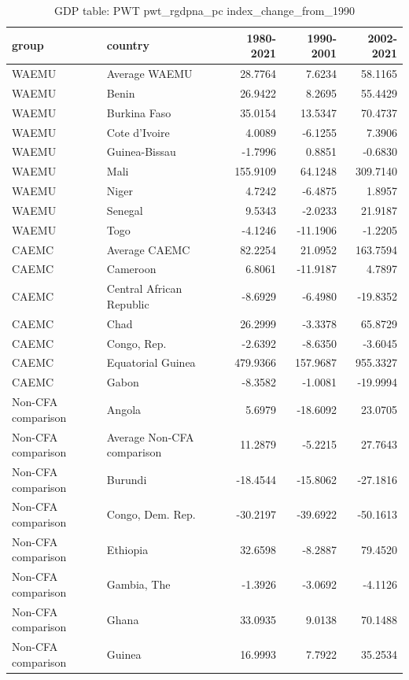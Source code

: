 \begin{table}

\caption{GDP table: PWT pwt_rgdpna_pc index_change_from_1990}
\centering
\begin{tabular}[t]{llrrr}
\toprule
group & country & 1980-2021 & 1990-2001 & 2002-2021\\
\midrule
WAEMU & Average WAEMU & 28.7764 & 7.6234 & 58.1165\\
WAEMU & Benin & 26.9422 & 8.2695 & 55.4429\\
WAEMU & Burkina Faso & 35.0154 & 13.5347 & 70.4737\\
WAEMU & Cote d'Ivoire & 4.0089 & -6.1255 & 7.3906\\
WAEMU & Guinea-Bissau & -1.7996 & 0.8851 & -0.6830\\
\addlinespace
WAEMU & Mali & 155.9109 & 64.1248 & 309.7140\\
WAEMU & Niger & 4.7242 & -6.4875 & 1.8957\\
WAEMU & Senegal & 9.5343 & -2.0233 & 21.9187\\
WAEMU & Togo & -4.1246 & -11.1906 & -1.2205\\
CAEMC & Average CAEMC & 82.2254 & 21.0952 & 163.7594\\
\addlinespace
CAEMC & Cameroon & 6.8061 & -11.9187 & 4.7897\\
CAEMC & Central African Republic & -8.6929 & -6.4980 & -19.8352\\
CAEMC & Chad & 26.2999 & -3.3378 & 65.8729\\
CAEMC & Congo, Rep. & -2.6392 & -8.6350 & -3.6045\\
CAEMC & Equatorial Guinea & 479.9366 & 157.9687 & 955.3327\\
\addlinespace
CAEMC & Gabon & -8.3582 & -1.0081 & -19.9994\\
Non-CFA comparison & Angola & 5.6979 & -18.6092 & 23.0705\\
Non-CFA comparison & Average Non-CFA comparison & 11.2879 & -5.2215 & 27.7643\\
Non-CFA comparison & Burundi & -18.4544 & -15.8062 & -27.1816\\
Non-CFA comparison & Congo, Dem. Rep. & -30.2197 & -39.6922 & -50.1613\\
\addlinespace
Non-CFA comparison & Ethiopia & 32.6598 & -8.2887 & 79.4520\\
Non-CFA comparison & Gambia, The & -1.3926 & -3.0692 & -4.1126\\
Non-CFA comparison & Ghana & 33.0935 & 9.0138 & 70.1488\\
Non-CFA comparison & Guinea & 16.9993 & 7.7922 & 35.2534\\

\end{tabular}
\end{table}
